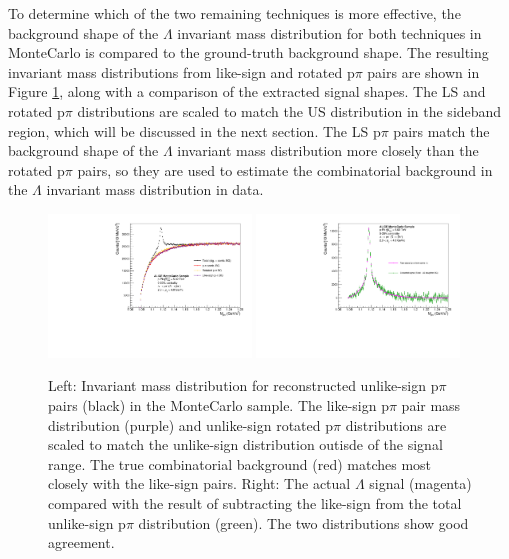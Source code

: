 To determine which of the two remaining techniques is more effective, the background shape of the $\Lambda$ invariant mass distribution for both techniques in MonteCarlo is compared to the ground-truth background shape. The resulting invariant mass distributions from like-sign and rotated p$\pi$ pairs are shown in Figure \ref{fig:background_approx_MC}, along with a comparison of the extracted signal shapes. 
The LS and rotated p$\pi$ distributions are scaled to match the US distribution in the sideband region, which will be discussed in the next section. The LS p$\pi$ pairs match the background shape of the $\Lambda$ invariant mass distribution more closely than the rotated p$\pi$ pairs, so they are used to estimate the combinatorial background in the $\Lambda$ invariant mass distribution in data.

\begin{figure}[ht]
\centering
    \includegraphics[width=0.48\textwidth]{figures/analysis/background_approx_MC.pdf}
    \includegraphics[width=0.48\textwidth]{figures/analysis/background_subtracted_signal_MC.pdf}
    \caption{Left: Invariant mass distribution for reconstructed unlike-sign p$\pi$ pairs (black) in the MonteCarlo sample.  The like-sign p$\pi$ pair mass distribution (purple) and unlike-sign rotated p$\pi$ distributions are scaled to match the unlike-sign distribution outisde of the \lmb signal range. The true combinatorial background (red) matches most closely with the like-sign pairs. Right: The actual $\Lambda$ signal (magenta) compared with the result of subtracting the like-sign from the total unlike-sign p$\pi$ distribution (green). The two distributions show good agreement.}
    \label{fig:background_approx_MC}
\end{figure}
	

